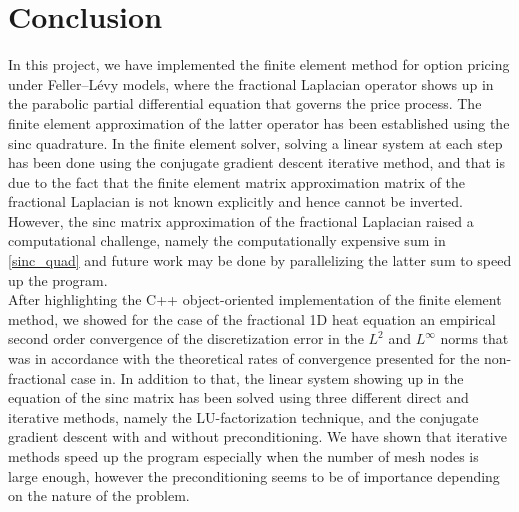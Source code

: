 \newpage
\section{Conclusion}
In this project, we have implemented the finite element method for option pricing under Feller--L\'{e}vy models, where the fractional Laplacian operator shows up in the parabolic partial differential equation that governs the price process. The finite element approximation of the latter operator has been established using the sinc quadrature. In the finite element solver, solving a linear system at each step has been done using the conjugate gradient descent iterative method, and that is due to the fact that the finite element matrix approximation matrix of the fractional Laplacian is not known explicitly and hence cannot be inverted. However, the sinc matrix approximation of the fractional Laplacian raised a computational challenge, namely the computationally expensive sum in \eqref{sinc_quad} and future work may be done by parallelizing the latter sum to speed up the program. \\
After highlighting the C++ object-oriented implementation of the finite element method, we showed  for the case of the fractional 1D heat equation an empirical second order convergence of the discretization error in the $L^2$ and $L^{\infty}$ norms that was in accordance with the theoretical rates of convergence presented for the non-fractional case in\cite{schwab}. In addition to that, the linear system showing up in the equation of the sinc matrix has been solved using three different direct and iterative methods, namely the LU-factorization technique, and the conjugate gradient descent with and without preconditioning. We have shown that iterative methods speed up the program especially when the number of mesh nodes is large enough, however the preconditioning seems to be of importance depending on the nature of the problem.
